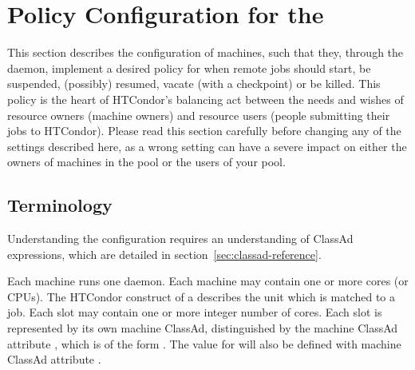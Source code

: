 \section{\label{sec:Configuring-Policy}Policy Configuration for the }

This section describes the configuration of machines,
such that they,
through the  daemon,
implement a desired policy for when remote jobs should start, be
suspended, (possibly) resumed, vacate (with a checkpoint) or be killed.
This policy is the heart of HTCondor's balancing act
between the needs and wishes of resource owners (machine owners) and
resource users (people submitting their jobs to HTCondor).
Please read
this section carefully before changing any of the settings
described here, as a wrong setting can have a severe impact on
either the owners of machines in the pool or the users of your pool.

\subsection{\label{sec:Startd-Terminology}Terminology}

Understanding the configuration requires an understanding of
ClassAd expressions,
which are detailed in section~\ref{sec:classad-reference}.

Each machine runs one  daemon.
Each machine may contain one or more cores (or CPUs).
The HTCondor construct of a  describes the unit which
is matched to a job.
Each slot may contain one or more integer number of cores.
Each slot is represented by its own machine ClassAd,
distinguished by the machine ClassAd attribute ,
which is of the form .
The value for  will also be defined with 
machine ClassAd attribute .

